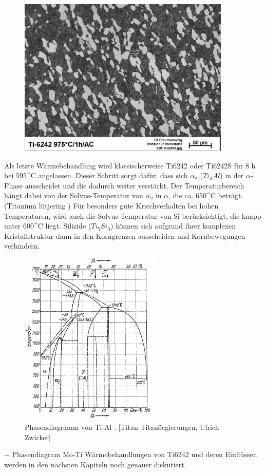 \begin{figure}[H]
	\centering
	\includegraphics[width=0.9\textwidth]{Bilder/LM-975-1h-AC}
	\caption{}
	\label{L.M}
\end{figure}


Als letzte Wärmebehandlung wird klassischerweise  Ti6242 oder Ti6242S für  8 h bei 595^\circ C angelassen. Dieser Schritt sorgt dafür, dass sich $\alpha_2$ ($Ti_3Al$) in der $\alpha$-Phase ausscheidet und die dadurch weiter verstärkt. Der Temperaturbereich hängt dabei von der Solvus-Temperatur von $\alpha_2$ in $\alpha$, die ca. 650^\circ C beträgt.(Titanium lütjering )
Für besonders gute Kriechverhalten bei hohen Temperaturen, wird auch die Solvus-Temperatur von Si berücksichtigt, die knapp unter 600^\circ C liegt. Silizide ($Ti_5Si_3$) können sich aufgrund ihrer komplexen Kristallstruktur dann in den Korngrenzen ausscheiden und Kornbewegungen verhindern.


\begin{figure}[H]
	\centering
	\includegraphics[width=0.6\textwidth]{Bilder/TiAl}
	\caption{Phasendiagramm von Ti-Al . [Titan Titanöegierungen, Ulrich Zwicker]}
\end{figure}
+ Phasendiagram Mo-Ti
Wärmebehandlungen von Ti6242 und deren Einflüssen werden in den nächsten Kapiteln noch genauer diskutiert.


